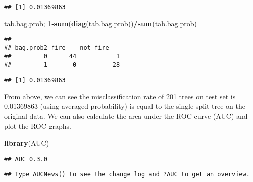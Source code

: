 \documentclass[
]{article}
\newenvironment{Shaded}{\begin{snugshade}}{\end{snugshade}}
\newcommand{\DataTypeTok}[1]{\textcolor[rgb]{0.13,0.29,0.53}{#1}}
\newcommand{\DecValTok}[1]{\textcolor[rgb]{0.00,0.00,0.81}{#1}}
\newcommand{\FloatTok}[1]{\textcolor[rgb]{0.00,0.00,0.81}{#1}}
\newcommand{\KeywordTok}[1]{\textcolor[rgb]{0.13,0.29,0.53}{\textbf{#1}}}
\newcommand{\NormalTok}[1]{#1}
\newcommand{\OperatorTok}[1]{\textcolor[rgb]{0.81,0.36,0.00}{\textbf{#1}}}
\newcommand{\StringTok}[1]{\textcolor[rgb]{0.31,0.60,0.02}{#1}}
\begin{document}
\begin{verbatim}
## [1] 0.01369863
\end{verbatim}

\begin{Shaded}
\begin{Highlighting}[]
\NormalTok{tab.bag.prob; }\DecValTok{1}\OperatorTok{-}\KeywordTok{sum}\NormalTok{(}\KeywordTok{diag}\NormalTok{(tab.bag.prob))}\OperatorTok{/}\KeywordTok{sum}\NormalTok{(tab.bag.prob)}
\end{Highlighting}
\end{Shaded}

\begin{verbatim}
##          
## bag.prob2 fire    not fire   
##         0      44           1
##         1       0          28
\end{verbatim}

\begin{verbatim}
## [1] 0.01369863
\end{verbatim}

From above, we can see the misclassification rate of 201 trees on test
set is 0.01369863 (using averaged probability) is equal to the single
split tree on the original data. We can also calculate the area under
the ROC curve (AUC) and plot the ROC graphs.

\begin{Shaded}
\begin{Highlighting}[]
\KeywordTok{library}\NormalTok{(AUC)}
\end{Highlighting}
\end{Shaded}

\begin{verbatim}
## AUC 0.3.0
\end{verbatim}

\begin{verbatim}
## Type AUCNews() to see the change log and ?AUC to get an overview.
\end{verbatim}

\begin{Shaded}
\end{Shaded}
\end{document}

